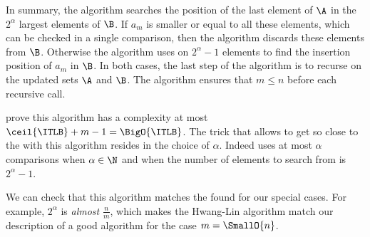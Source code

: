 In summary, the algorithm searches the position of the last element of \(\A\)
in the \(2^{\alpha}\) largest elements of \(\B\). If \(a_m\) is smaller or
equal to all these elements, which can be checked in a single comparison, then
the algorithm discards these elements from \(\B\). Otherwise the algorithm uses
\binarysearch on \(2^{\alpha}-1\) elements to find the insertion position of
\(a_m\) in \(\B\). In both cases, the last step of the algorithm is to recurse
on the updated sets \(\A\) and \(\B\). The algorithm ensures that \(m \le n\)
before each recursive call.

\citet*{DBLP:journals/siamcomp/HwangL72} prove this algorithm has a complexity
at most \(\ceil{\ITLB} + m - 1 = \BigO{\ITLB}\). The trick that allows to
get so close to the \ITLB with this algorithm resides in the choice of
\(\alpha\). Indeed \binarysearch uses at most \(\alpha\) comparisons
when \(\alpha \in \N\) and when the number of elements to search
from is \(2^{\alpha}-1\).

We can check that this algorithm matches the \ITLB found for our
special cases. For example, \(2^\alpha\) is \emph{almost} \(\frac{n}{m}\),
which makes the Hwang-Lin algorithm match our description of a good algorithm
for the case \(m = \SmallO{n}\).
